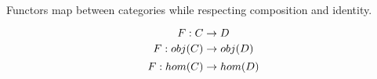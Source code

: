 \documentclass[../../notes.tex]{subfiles}
\begin{document}
\begin{definition}

  Functors map between categories while respecting composition and identity.

  $$ F : C \rightarrow D $$
  $$ F : obj(C) \rightarrow obj(D) $$
  $$ F : hom(C) \rightarrow hom(D) $$

\end{definition}

\end{document}
